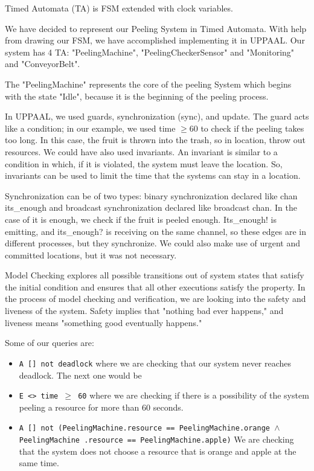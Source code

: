 \documentclass[conference]{IEEEtran}
\begin{document}
Timed Automata (TA) is FSM extended with clock variables.  

We have decided to represent our Peeling System in Timed Automata. With help from drawing our FSM, we have accomplished implementing it in UPPAAL. Our system has 4 TA: "PeelingMachine", "PeelingCheckerSensor" and "Monitoring" and "ConveyorBelt".  

The "PeelingMachine" represents the core of the peeling System which begins with the state "Idle",  because it is the beginning of the peeling process. 

In UPPAAL, we used guards, synchronization (sync), and update. The guard acts like a condition; in our example, we used time $\geq 60$ to check if the peeling takes too long. In this case, the fruit is thrown into the trash, so in location, throw out resources. We could have also used invariants. An invariant is similar to a condition in which, if it is violated, the system must leave the location. So, invariants can be used to limit the time that the systems can stay in a location.

Synchronization can be of two types: binary synchronization declared like chan its\_enough and broadcast synchronization declared like broadcast chan. In the case of it is enough, we check if the fruit is peeled enough. Its\_enough! is emitting, and its\_enough? is receiving on the same channel, so these edges are in different processes, but they synchronize. We could also make use of urgent and committed locations, but it was not necessary. 

Model Checking explores all possible transitions out of system states that satisfy the initial condition and ensures that all other executions satisfy the property. In the process of model checking and verification, we are looking into the safety and liveness of the system. Safety implies that "nothing bad ever happens," and liveness means "something good eventually happens." 

Some of our queries are: 
\begin{itemize}
\item \texttt{A [] not deadlock}
where we are checking that our system never reaches deadlock. The next one would be  

\item \texttt{E <> time $\geq$ 60} 
where we are checking if there is a possibility of the system peeling a resource for more than 60 seconds.  

\item \texttt{A [] not (PeelingMachine.resource == PeelingMachine.orange $\land$ PeelingMachine
.resource == PeelingMachine.apple)}
We are checking that the system does not choose a resource that is orange and apple at the same time.  
\end{itemize}
\end{document}
